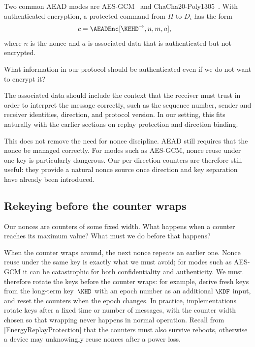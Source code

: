 Two common \ac{AEAD} modes are
AES-\ac{GCM}~\autocite{McGrewViega2004gcm,SP80038D} and
ChaCha20-Poly1305~\autocite{RFC8439}.
With authenticated encryption, a protected command from \(H\) to
\(D_i\) has the form
\begin{align*}
  c &= \AEADEnc[\KEHD^{\rightarrow}, n, m, a],
\end{align*}
where \(n\) is the nonce and \(a\) is associated data that is
authenticated but not encrypted.

\begin{exercise}
  What information in our protocol should be authenticated even if we do not
  want to encrypt it?
\end{exercise}

The associated data should include the context that the receiver must trust in
order to interpret the message correctly, such as the sequence number, sender
and receiver identities, direction, and protocol version.
In our setting, this fits naturally with the earlier sections on replay
protection and direction binding.

This does not remove the need for nonce discipline.
\ac{AEAD} still requires that the nonce be managed correctly.
For modes such as AES-\ac{GCM}, nonce reuse under one key is particularly
dangerous.
Our per-direction counters are therefore still useful: they provide a natural
nonce source once direction and key separation have already been introduced.

\subsection{Rekeying before the counter wraps}

\begin{exercise}
  Our nonces are counters of some fixed width.
  What happens when a counter reaches its maximum value?
  What must we do before that happens?
\end{exercise}

When the counter wraps around, the next nonce repeats an earlier one.
Nonce reuse under the same key is exactly what we must avoid; for modes
such as AES-\ac{GCM} it can be catastrophic for both confidentiality and
authenticity.
We must therefore rotate the keys before the counter wraps: for example,
derive fresh keys from the long-term key~\(\KHD\) with an epoch number as
an additional \(\KDF\) input, and reset the counters when the epoch
changes.
In practice, implementations rotate keys after a fixed time or number of
messages, with the counter width chosen so that wrapping never happens in
normal operation.
Recall from \cref{EnergyReplayProtection} that the counters must also
survive reboots, otherwise a device may unknowingly reuse nonces after a
power loss.

